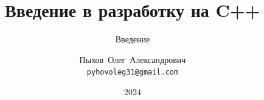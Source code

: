 \documentclass{beamer}
\title{Введение в разработку на C++}
\subtitle{Введение}
\author{Пыхов~Олег~Александрович\inst{1} \\ \texttt{pyhovoleg31@gmail.com}}
\institute{
    \inst{1}%
    ООО~"Прософт-Системы"
}
\date{2024}
\begin{document}
\frame{\titlepage}
\end{document}

